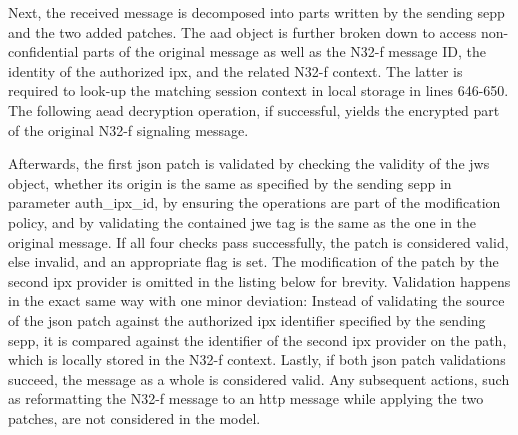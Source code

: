 Next, the received message is decomposed into parts written by the sending \gls{sepp} and the two added patches.
The \gls{aad} object is further broken down to access non-confidential parts of the original message as well as the N32-f message ID, the identity of the authorized \gls{ipx}, and the related N32-f context.
The latter is required to look-up the matching session context in local storage in lines 646-650.
The following \gls{aead} decryption operation, if successful, yields the encrypted part of the original N32-f signaling message.

Afterwards, the first \gls{json} patch is validated by checking the validity of the \gls{jws} object, whether its origin is the same as specified by the sending \gls{sepp} in parameter {\sffamily auth\_ipx\_id}, by ensuring the operations are part of the modification policy, and by validating the contained \gls{jwe} tag is the same as the one in the original message.
If all four checks pass successfully, the patch is considered valid, else invalid, and an appropriate flag is set.
The modification of the patch by the second \gls{ipx} provider is omitted in the listing below for brevity.
Validation happens in the exact same way with one minor deviation: Instead of validating the source of the \gls{json} patch against the authorized \gls{ipx} identifier specified by the sending \gls{sepp}, it is compared against the identifier of the second \gls{ipx} provider on the path, which is locally stored in the N32-f context.
Lastly, if both \gls{json} patch validations succeed, the message as a whole is considered valid.
Any subsequent actions, such as reformatting the N32-f message to an \gls{http} message while applying the two patches, are not considered in the model.

